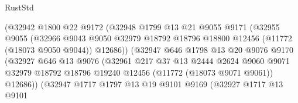 \begin{lexlean}{RustStd}
\begin{coremodule}
                              (@32942
                                @1800
                                @22
                                @9172
                                (@32948
                                  @1799
                                  @13
                                  @21
                                  @9055
                                  @9171
                                  (@32955
                                    @9055
                                    (@32966
                                      @9043
                                      @9050
                                      @32979
                                      @18792
                                      @18796
                                      @18800
                                      @12456
                                      (@11772 (@18073 @9050 @9044))
                                      @12686))
                                  (@32947
                                    @646
                                    @1798
                                    @13
                                    @20
                                    @9076
                                    @9170
                                    (@32927
                                      @646
                                      @13
                                      @9076
                                      (@32961
                                        @217
                                        @37
                                        @13
                                        @2444
                                        @2624
                                        @9060
                                        @9071
                                        @32979
                                        @18792
                                        @18796
                                        @19240
                                        @12456
                                        (@11772 (@18073 @9071 @9061))
                                        @12686))
                                    (@32947
                                      @1717
                                      @1797
                                      @13
                                      @19
                                      @9101
                                      @9169
                                      (@32927
                                        @1717
                                        @13
                                        @9101

\end{coremodule}
\end{lexlean}
